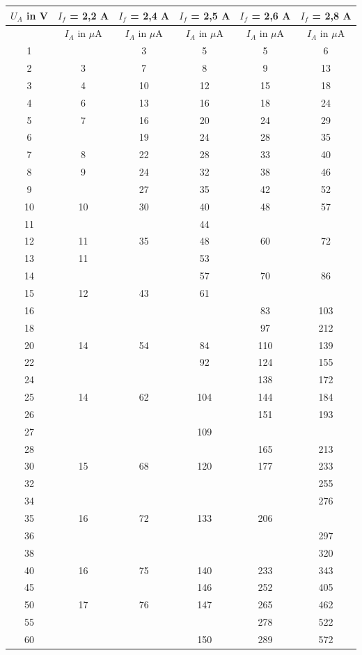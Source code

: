 \renewcommand{\arraystretch}{0.9}
\begin{table}[H]
\begin{tabular}{|c||c|c|c|c|c|}
$U_A$ in V & $I_f$ = 2,2 A  & $I_f$ = 2,4 A  & $I_f$ = 2,5 A  & $I_f$ = 2,6 A  & $I_f$ = 2,8 A\\
 \hline
& $I_A$ in $\mu$A &$I_A$ in $\mu$A &$I_A$ in $\mu$A &$I_A$ in $\mu$A &$I_A$ in $\mu$A \\ 
\hline
1&	&	3&	5&	5&	6\\
2&	3&	7&	8&	9&	13\\
3&	4&	10&	12&	15&	18\\
4&	6&	13&	16&	18&	24\\
5&	7&	16&	20&	24&	29\\
6&	&	19&	24&	28&	35\\
7&	8&	22&	28&	33&	40\\
8&	9&	24&	32&	38&	46\\
9&	&	27&	35&	42&	52\\
10&	10&	30&	40&	48&	57\\
11&	&	&	44&	&	\\
12&	11&	35&	48&	60&	72\\
13&	11&	&	53&	&	\\
14&	&	&	57&	70&	86\\
15&	12&	43&	61&	&	\\
16&	&	&	&	83&	103\\
18&	&	&	&	97&	212\\
20&	14&	54&	84&	110&	139\\
22&	&	&	92&	124&	155\\
24&	&	&	&	138&	172\\
25&	14&	62&	104&	144&	184\\
26&	&	&	&	151&	193\\
27&	&	&	109&	&	\\
28&	&	&		&165&	213\\
30&	15	&68&	120&	177&	233\\
32&	&	&	&	&	255\\
34&	&	&	&	&	276\\
35&	16&	72&	133&	206&	\\
36&	&	&	&	&	297\\
38&	&	&	&	&	320\\
40&	16&	75&	140&	233&	343\\
45&	&	&	146&	252&	405\\
50&	17&	76&	147&	265&	462\\
55&	&	&	&	278&	522\\
60&	&	&	150&	289&	572\\

\end{tabular}
\end{table}
